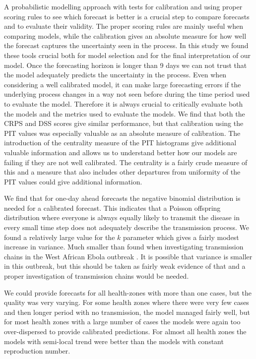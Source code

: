 \documentclass[12pt]{article}
\begin{document}
A probabilistic modelling approach with tests for calibration and using proper scoring rules to see which forecast is better is a crucial step to compare forecasts and to evaluate their validity. The proper scoring rules are mainly useful when comparing models, while the calibration gives an absolute measure for how well the forecast captures the uncertainty seen in the process. In this study we found these tools crucial both for model selection and for the final interpretation of our model. Once the forecasting horizon is longer than 9 days we can not trust that the model adequately predicts the uncertainty in the process. Even when considering a well calibrated model, it can make large forecasting errors if the underlying process changes in a way not seen before during the time period used to evaluate the model. Therefore it is always crucial to critically evaluate both the models and the metrics used to evaluate the models. We find that both the CRPS and DSS scores give similar performance, but that calibration using the PIT values was especially valuable as an absolute measure of calibration. The introduction of the centrality measure of the PIT histograms give additional valuable information and allows us to understand better how our models are failing if they are not well calibrated. The centrality is a fairly crude measure of this and a measure that also includes other departures from uniformity of the PIT values could give additional information. 

We find that for one-day ahead forecasts the negative binomial distribution is needed for a calibrated forecast. This indicates that a Poisson offspring distribution where everyone is always equally likely to transmit the disease in every small time step does not adequately describe the transmission process. We found a relatively large value for the $k$ parameter which gives a fairly modest increase in variance. Much smaller than found when investigating transmission chains in the West African Ebola outbreak \cite{internationalebolaresponseteamExposurePatternsDriving2016}. It is possible that variance is smaller in this outbreak, but this should be taken as fairly weak evidence of that and a proper investigation of transmission chains would be needed. 

We could provide forecasts for all health-zones with more than one cases, but the quality was very varying. For some health zones where there were very few cases and then longer period with no transmission, the model managed fairly well, but for most health zones with a large number of cases the models were again too over-dispersed to provide calibrated predictions. For almost all health zones the models with semi-local trend were better than the models with constant reproduction number. 
\end{document}
